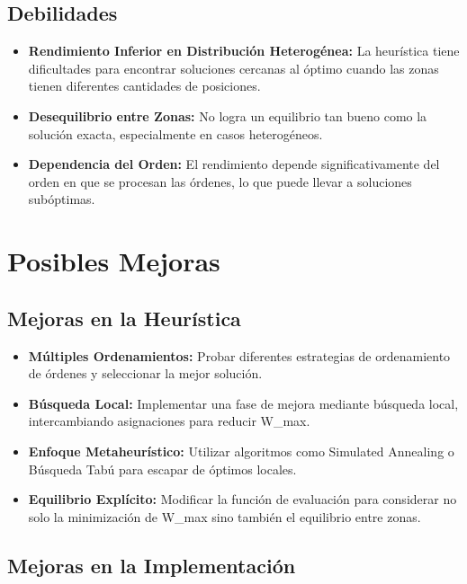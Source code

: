 \documentclass{hw-template}
\begin{document}
\subsection*{Debilidades}

\begin{itemize}
    \item \textbf{Rendimiento Inferior en Distribución Heterogénea:} La heurística tiene dificultades para encontrar soluciones cercanas al óptimo cuando las zonas tienen diferentes cantidades de posiciones.
    
    \item \textbf{Desequilibrio entre Zonas:} No logra un equilibrio tan bueno como la solución exacta, especialmente en casos heterogéneos.
    
    \item \textbf{Dependencia del Orden:} El rendimiento depende significativamente del orden en que se procesan las órdenes, lo que puede llevar a soluciones subóptimas.
\end{itemize}

\section{Posibles Mejoras}

\subsection{Mejoras en la Heurística}

\begin{itemize}
    \item \textbf{Múltiples Ordenamientos:} Probar diferentes estrategias de ordenamiento de órdenes y seleccionar la mejor solución.
    
    \item \textbf{Búsqueda Local:} Implementar una fase de mejora mediante búsqueda local, intercambiando asignaciones para reducir W\_max.
    
    \item \textbf{Enfoque Metaheurístico:} Utilizar algoritmos como Simulated Annealing o Búsqueda Tabú para escapar de óptimos locales.
    
    \item \textbf{Equilibrio Explícito:} Modificar la función de evaluación para considerar no solo la minimización de W\_max sino también el equilibrio entre zonas.
\end{itemize}

\subsection{Mejoras en la Implementación}
\end{document}
